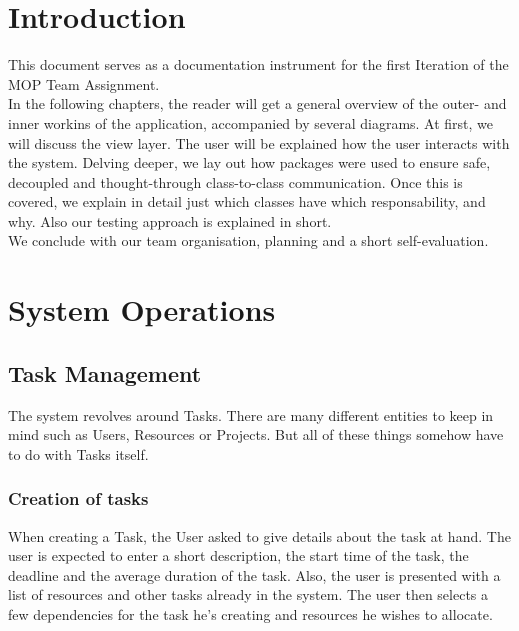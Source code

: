 



\maakvoorblad

\newpage
\thispagestyle{empty}
\mbox{}

\newpage
\maakvoorblad

\newpage

\tableofcontents

\newpage
\section{Introduction}
		This document serves as a documentation instrument for the first Iteration of the MOP Team Assignment.\\
		In the following chapters, the reader will get a general overview of the outer- and inner workins of the application, accompanied by several diagrams. At first, we will discuss the view layer. The user will be explained how the user interacts with the system. Delving deeper, we lay out how packages were used to ensure safe, decoupled and thought-through class-to-class communication.
		Once this is covered, we explain in detail just which classes have which responsability, and why. Also our testing approach is explained in short.\\
		We conclude with our team organisation, planning and a short self-evaluation.
	\section{System Operations}
		\subsection{Task Management}
			The system revolves around Tasks. There are many different entities to keep in mind such as Users, Resources or Projects.
			But all of these things somehow have to do with Tasks itself.
			\subsubsection{Creation of tasks}
				When creating a Task, the User asked to give details about the task at hand. The user is expected to enter a short description, the start time of the task, the deadline and the average duration of the task.
				Also, the user is presented with a list of resources and other tasks already in the system. The user then selects a few dependencies for the task he's creating and resources he wishes to allocate.

